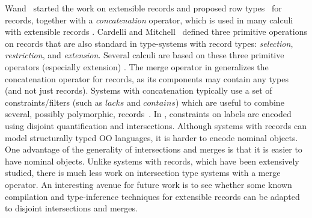 Wand~\cite{wand1987complete} started the work on extensible records and proposed
row types~\cite{wand1989type} for records, together with a \emph{concatenation}
operator, which is used in many calculi with extensible records
\cite{harper1991record,remy1992typing,wand1989type,sulzmann97designing,makholm05type,pottier2003constraint}.
Cardelli and Mitchell~\cite{cardelli1990operations} defined three primitive operations on
records that are also standard in type-systems with record types: 
\emph{selection}, \emph{restriction}, and \emph{extension}. 
Several calculi are based on these three primitive operators (especially extension)
\cite{remy1993type,gaster1996polymorphic,jones99lightweight,leijen2004first,leijen2005extensible,blume2006extensible}.
The merge operator in \name generalizes the concatenation operator for
records, as its components may contain any types (and not just
records).  Systems with concatenation typically use a set of
constraints/filters (such as $lacks$ and $contains$) which are useful
to combine several, possibly polymorphic,
records~\cite{leijen2005extensible}.  In \name, constraints on labels
are encoded using disjoint quantification and intersections.  Although
systems with records can model structurally typed OO languages, it is
harder to encode nominal objects. One advantage of the 
generality of intersections and merges is that it is easier to
have nominal objects. Unlike systems with records,
which have been extensively studied, there is much less work on
intersection type systems with a merge operator. An interesting avenue
for future work is to see whether some known compilation and
type-inference techniques for extensible records can be adapted to
disjoint intersections and merges.


